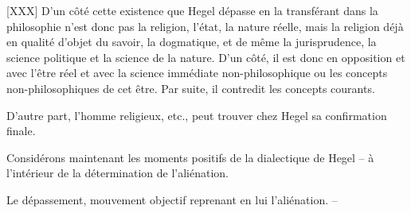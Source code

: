\documentclass[french,twoside]{book} %
\begin{document}
[XXX] D’un côté cette existence que Hegel dépasse en la transférant dans la philosophie n’est donc pas la religion, l’état, la nature réelle, mais la religion déjà en qualité d’objet du savoir, la dogmatique, et de même la jurisprudence, la science politique et la science de la nature. D’un côté, il est donc en opposition et avec l’être réel et avec la science immédiate non-philosophique ou les concepts non-philosophiques de cet être. Par suite, il contredit les concepts courants.\par
D’autre part, l’homme religieux, etc., peut trouver chez Hegel sa confirmation finale.\par
Considérons maintenant les moments positifs de la dialectique de Hegel – à l’intérieur de la détermination de l’aliénation.\par

\begin{listalpha}[itemsep=0pt,]
\item Le dépassement, mouvement objectif reprenant en lui l’aliénation. –
\end{listalpha}
\end{document}
